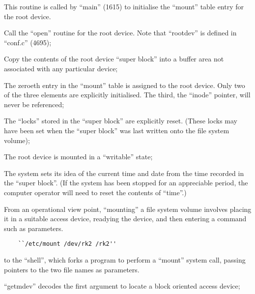 
This routine is called by ``main'' (1615)
to initialise the ``mount'' table entry
for the root device.

\bd
\item[6926:] Call the ``open'' routine for the
      root device. Note that ``rootdev''
      is defined in ``conf.c'' (4695);

\item[6931:] Copy the contents of the root
      device ``super block'' into a
      buffer area not associated with
      any particular device;

\item[6933:] The zeroeth entry in the ``mount''
      table is assigned to the root
      device. Only two of the three
      elements are explicitly initialised. The third, the ``inode''
      pointer, will never be referenced;

\item[6936:] The ``locks'' stored in the ``super
      block'' are explicitly reset.
      (These locks may have been set
      when the ``super block'' was last
      written onto the file system
      volume);

\item[6938:] The root device is mounted
      in a ``writable'' state;

\item[6939:] The system sets its idea of the
      current time and date from the
      time recorded in the ``super
      block''. (If the system has been
      stopped for an appreciable
      period, the computer operator
      will need to reset the contents
      of ``time''.)
\ed


From an operational view point, ``mounting''  a  file  system  volume  involves
placing it in a suitable access device,
readying  the device, and then entering
a command such as
parameters.

\begin{verbatim}
    ``/etc/mount /dev/rk2 /rk2''
\end{verbatim}

\noindent to the ``shell'', which forks  a  program
to perform a ``mount'' system call, passing pointers to the two file  names  as
parameters.



\bd
\item[6093:] ``getmdev'' decodes the first argument  to  locate a block oriented
      access device;

